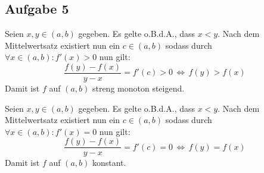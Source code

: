 \documentclass[a4paper,graphics,11pt]{article}
\newcommand{\aufgabe}[1]{\subsection*{Aufgabe #1}}
\begin{document}
\aufgabe{5}

Seien $x,y \in (a,b)$ gegeben. Es gelte o.B.d.A., dass $x<y$. Nach dem Mittelwertsatz existiert nun ein
$c \in (a,b)$ sodass durch $\forall x \in (a,b) \colon f'(x) > 0$ nun gilt:
$$
    \frac{f(y) - f(x)}{y-x} = f'(c) > 0 \,\Longleftrightarrow\, f(y) > f(x)
$$
Damit ist $f$ auf $(a,b)$ streng monoton steigend.

Seien $x,y \in (a,b)$ gegeben. Es gelte o.B.d.A., dass $x < y$. Nach dem Mittelwertsatz existiert nun ein
$c \in (a,b)$ sodass durch $\forall x \in (a,b) \colon f'(x) = 0$ nun gilt:
$$
    \frac{f(y) - f(x)}{y-x} = f'(c) = 0 \,\Longleftrightarrow\, f(y) = f(x)
$$
Damit ist $f$ auf $(a,b)$ konstant.
\end{document}
